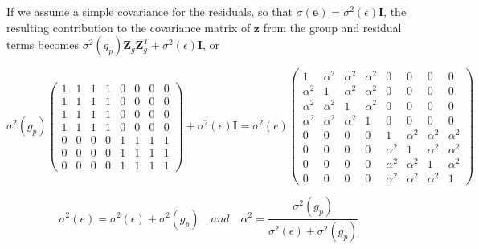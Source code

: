 \documentclass{article}
\begin{document}
If we assume a simple covariance for the residuals, so that  $ \sigma(\mathbf{e}) = \sigma^2(\epsilon)\mathbf{I} $, the resulting contribution to the covariance matrix of  $ \mathbf{z} $ from the group and residual terms becomes  $ \sigma^2(g_p)\mathbf{Z}_g\mathbf{Z}_g^T + \sigma^2(\epsilon)\mathbf{I} $, or

\begin{equation}
\sigma^{2}(g_{p})\begin{pmatrix}{{{1}}}&{{{1}}}&{{{1}}}&{{{1}}}&{{{0}}}&{{{0}}}&{{{0}}}&{{{0}}} \\{{{1}}}&{{{1}}}&{{{1}}}&{{{1}}}&{{{0}}}&{{{0}}}&{{{0}}}&{{{0}}} \\{{{1}}}&{{{1}}}&{{{1}}}&{{{1}}}&{{{0}}}&{{{0}}}&{{{0}}}&{{{0}}} \\{{{1}}}&{{{1}}}&{{{1}}}&{{{1}}}&{{{0}}}&{{{0}}}&{{{0}}}&{{{0}}} \\{{{0}}}&{{{0}}}&{{{0}}}&{{{0}}}&{{{1}}}&{{{1}}}&{{{1}}}&{{{1}}} \\{{{0}}}&{{{0}}}&{{{0}}}&{{{0}}}&{{{1}}}&{{{1}}}&{{{1}}}&{{{1}}} \\{{{0}}}&{{{0}}}&{{{0}}}&{{{0}}}&{{{1}}}&{{{1}}}&{{{1}}}&{{{1}}}\end{pmatrix}+\sigma^{2}(\epsilon)\mathbf{I}=\sigma^{2}(e)\begin{pmatrix}{{{1}}}&{{{\alpha^{2}}}}&{{{\alpha^{2}}}}&{{{\alpha^{2}}}}&{{{0}}}&{{{0}}}&{{{0}}}&{{{0}}} \\{{{\alpha^{2}}}}&{{{1}}}&{{{\alpha^{2}}}}&{{{\alpha^{2}}}}&{{{0}}}&{{{0}}}&{{{0}}}&{{{0}}} \\{{{\alpha^{2}}}}&{{{\alpha^{2}}}}&{{{1}}}&{{{\alpha^{2}}}}&{{{0}}}&{{{0}}}&{{{0}}}&{{{0}}} \\{{{\alpha^{2}}}}&{{{\alpha^{2}}}}&{{{\alpha^{2}}}}&{{{1}}}&{{{0}}}&{{{0}}}&{{{0}}}&{{{0}}} \\{{{0}}}&{{{0}}}&{{{0}}}&{{{0}}}&{{{1}}}&{{{\alpha^{2}}}}&{{{\alpha^{2}}}}&{{{\alpha^{2}}}} \\{{{0}}}&{{{0}}}&{{{0}}}&{{{0}}}&{{{\alpha^{2}}}}&{{{1}}}&{{{\alpha^{2}}}}&{{{\alpha^{2}}}} \\{{{0}}}&{{{0}}}&{{{0}}}&{{{0}}}&{{{\alpha^{2}}}}&{{{\alpha^{2}}}}&{{{1}}}&{{{\alpha^{2}}}} \\{{{0}}}&{{{0}}}&{{{0}}}&{{{0}}}&{{{\alpha^{2}}}}&{{{\alpha^{2}}}}&{{{\alpha^{2}}}}&{{{1}}}\end{pmatrix}
\end{equation}

\begin{equation}
\sigma^{2}(e)=\sigma^{2}(\epsilon)+\sigma^{2}(g_{p})\quad and\quad\alpha^{2}=\frac{\sigma^{2}(g_{p})}{\sigma^{2}(\epsilon)+\sigma^{2}(g_{p})}
\end{equation}
\end{document}
